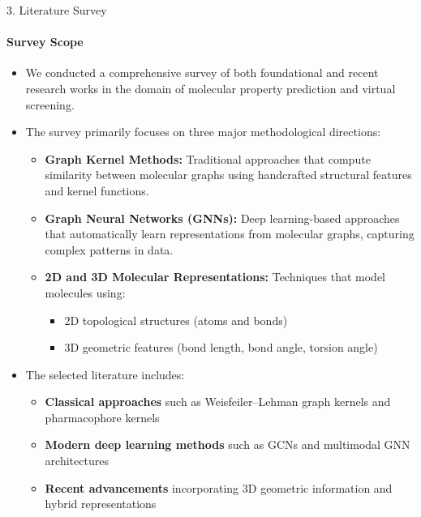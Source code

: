 \documentclass[aspectratio=169, 11pt]{beamer}
\begin{document}
\begin{frame}{3. Literature Survey}
\framesubtitle{Survey Scope}
\begin{itemize}

    \item We conducted a comprehensive survey of both foundational and recent research works in the domain of molecular property prediction and virtual screening.

    \item The survey primarily focuses on three major methodological directions:
    \begin{itemize}
        \item \textbf{Graph Kernel Methods:} Traditional approaches that compute similarity between molecular graphs using handcrafted structural features and kernel functions.
        
        \item \textbf{Graph Neural Networks (GNNs):} Deep learning-based approaches that automatically learn representations from molecular graphs, capturing complex patterns in data.
        
        \item \textbf{2D and 3D Molecular Representations:} Techniques that model molecules using:
        \begin{itemize}
            \item 2D topological structures (atoms and bonds)
            \item 3D geometric features (bond length, bond angle, torsion angle)
        \end{itemize}
    \end{itemize}

    \item The selected literature includes:
    \begin{itemize}
        \item \textbf{Classical approaches} such as Weisfeiler–Lehman graph kernels and pharmacophore kernels
        \item \textbf{Modern deep learning methods} such as GCNs and multimodal GNN architectures
        \item \textbf{Recent advancements} incorporating 3D geometric information and hybrid representations
    \end{itemize}
\end{itemize}
\end{frame}
\end{document}
